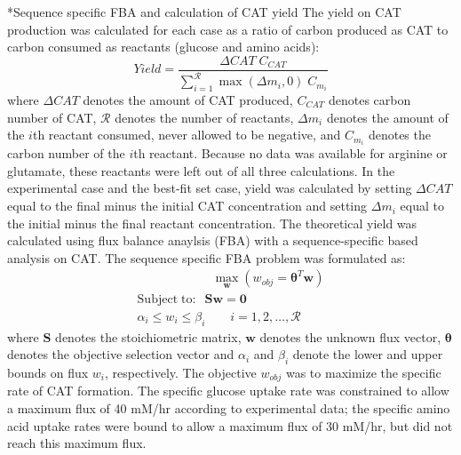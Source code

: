 \documentclass[12pt]{article}
\makeatletter
\renewcommand\subsection{\@startsection
	{subsection}{2}{0mm}
	{-0.05in}
	{-0.5\baselineskip}
	{\normalfont\normalsize\bfseries}}
\makeatother
\begin{document}
\subsection*{Sequence specific FBA and calculation of CAT yield}
The yield on CAT production was calculated for each case as a ratio of carbon produced as CAT to carbon consumed as reactants (glucose and amino acids):
\begin{equation}\label{eqn:yield-definition}
	Yield=\frac{\Delta CAT\;C_{CAT}}{\sum_{i=1}^{\mathcal{R}}\max(\Delta m_{i},0)\;C_{m_i}}
\end{equation}
where $\Delta CAT$ denotes the amount of CAT produced, $C_{CAT}$ denotes carbon number of CAT, $\mathcal{R}$ denotes the number of reactants, $\Delta m_{i}$ denotes the amount of the $i$th reactant consumed, never allowed to be negative, and $C_{m_i}$ denotes the carbon number of the $i$th reactant.
Because no data was available for arginine or glutamate, these reactants were left out of all three calculations.
In the experimental case and the best-fit set case, yield was calculated by setting $\Delta CAT$ equal to the final minus the initial CAT concentration and setting $\Delta m_{i}$ equal to the initial minus the final reactant concentration.
The theoretical yield was calculated using flux balance anaylsis (FBA) with a sequence-specific based analysis on CAT.
The sequence specific FBA \cite{2002_allen_palsson} problem was formulated as:
\begin{equation}\nonumber
 \begin{multlined}
	\qquad \qquad \qquad \max_{\boldsymbol{w}}{} \! \left( w_{obj} = \mathbf{\boldsymbol{\theta}}^T \boldsymbol{w} \right) \\
	\mathrm{Subject \; to:}
	 \; \; \mathbf{S}\mathbf{w}=\mathbf{0} \\
\alpha_i \leq w_i \leq \beta_i  \qquad i=1,2,\hdots,\mathcal{R}
 \end{multlined}
\end{equation}
where $\mathbf{S}$ denotes the stoichiometric matrix, $\mathbf{w}$ denotes the unknown flux vector, $\boldsymbol{\theta}$ denotes the objective selection vector
and $\alpha_i$ and $\beta_i$ denote the lower and upper bounds on flux $w_{i}$, respectively.
The objective $w_{obj}$ was to maximize the specific rate of CAT formation.
The specific glucose uptake rate was constrained to allow a maximum flux of 40 mM/hr according to experimental data; the specific amino acid uptake rates were bound to allow a maximum flux of 30 mM/hr, but did not reach this maximum flux.
\end{document}

